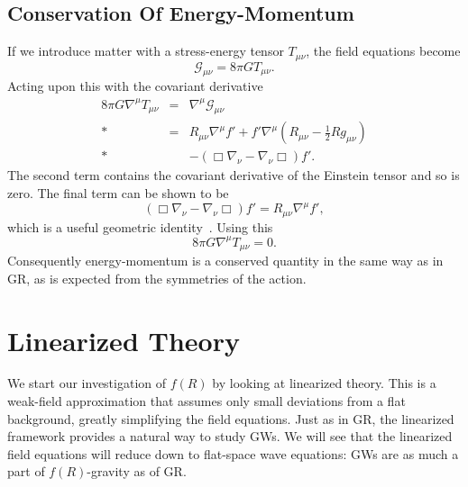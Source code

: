 \documentclass[aps,prd,amsfonts,amssymb,amsmath,nofootinbib,reprint,showpacs]{revtex4-1}
\newcommand{\recip}[1]{\ensuremath{\frac{1}{#1}}}
\begin{document}
\subsection{Conservation Of Energy-Momentum}

If we introduce matter with a stress-energy tensor $T_{\mu\nu}$, the field equations become
\begin{equation}
\mathcal{G}_{\mu\nu} = 8\pi GT_{\mu\nu}.
\end{equation}
Acting upon this with the covariant derivative
\begin{eqnarray}
8\pi G\nabla^\mu T_{\mu\nu} & = & \nabla^\mu\mathcal{G}_{\mu\nu} \nonumber \\*
 & = & R_{\mu\nu}\nabla^\mu f' + f'\nabla^\mu\left(R_{\mu\nu} - \recip{2}R g_{\mu\nu}\right) \nonumber \\* 
 & & - \left(\Box\nabla_\nu - \nabla_\nu\Box\right)f'.
\end{eqnarray}
The second term contains the covariant derivative of the Einstein tensor and so is zero. The final term can be shown to be
\begin{equation}
\left(\Box\nabla_\nu - \nabla_\nu\Box\right)f' = R_{\mu\nu}\nabla^\mu f',
\end{equation}
which is a useful geometric identity~\cite{Koivisto2006a}. Using this
\begin{equation}
8\pi G\nabla^\mu T_{\mu\nu} = 0.
\end{equation}
Consequently energy-momentum is a conserved quantity in the same way as in GR, as is expected from the symmetries of the action.

\section{Linearized Theory\label{sec:Lin}}

We start our investigation of $f(R)$ by looking at linearized theory. This is a weak-field approximation that assumes only small deviations from a flat background, greatly simplifying the field equations. Just as in GR, the linearized framework provides a natural way to study GWs. We will see that the linearized field equations will reduce down to flat-space wave equations: GWs are as much a part of $f(R)$-gravity as of GR.
\end{document}
